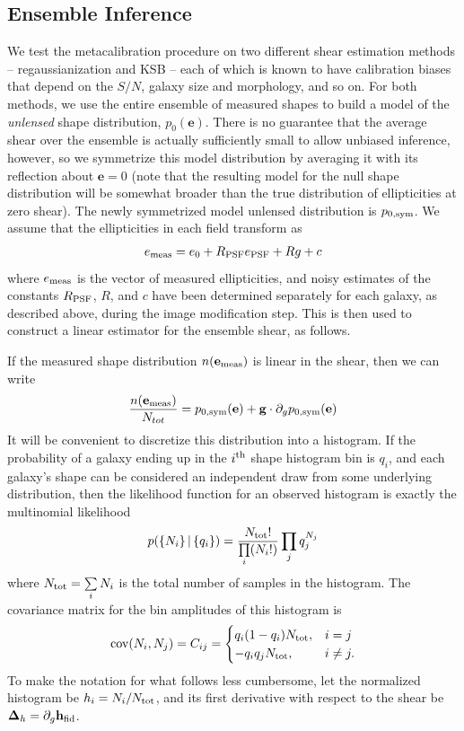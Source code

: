 \documentclass[iop]{emulateapj}
\begin{document}
\subsection{Ensemble Inference}
We test the metacalibration procedure on two different shear
estimation methods -- regaussianization and KSB -- each of which is
known to have calibration biases that depend on the $S/N$, galaxy size
and morphology, and so on. For both methods, we use the entire
ensemble of measured shapes to build a model of the {\it unlensed}
shape distribution, $p_0(\mathbf{e})$. There is no guarantee that the
average shear over the ensemble is actually sufficiently small to
allow unbiased inference, however, so we symmetrize this model
distribution by averaging it with its reflection about $\mathbf{e}=0$
(note that the resulting model for the null shape distribution will be
somewhat broader than the true distribution of ellipticities at zero
shear). The newly symmetrized model unlensed distribution is
$p_{0,\rm sym}$. We assume that the ellipticities in each field
transform as
\begin{align}
{e}_{\rm meas} = {e}_{0} + R_{\rm PSF}{e}_{\rm PSF} + R{g} + {c}
\label{eqn:edist_model}
\end{align}
where $e_{\rm meas}$ is the vector of measured ellipticities, and
noisy estimates of the constants $R_{\rm PSF}$, $R$, and $c$ have been
determined separately for each galaxy, as described above, during the
image modification step. This is then used to construct a linear
estimator for the ensemble shear, as follows.

If the measured shape distribution $n(\mathbf{e}_{\rm meas})$ is linear
in the shear, then we can write
\begin{align}
\frac{n(\mathbf{e}_{\rm meas})}{N_{tot}} = p_{0,\rm sym}(\mathbf{e}) + \mathbf{g}\cdot \partial_{g} p_{0,\rm sym}(\mathbf{e})
\end{align}
It will be convenient to discretize this distribution into a
histogram. If the probability of a galaxy ending up in the
$i^{\rm th}$ shape histogram bin is $q_i$, and each galaxy's shape can
be considered an independent draw from some underlying distribution,
then the likelihood function for an observed histogram is exactly the
multinomial likelihood
\begin{align}
p( \left\{N_i\right\} |\left\{ q_i\right\} ) = \frac{N_{\rm tot}!}{\prod\limits_i (N_i!)}\prod\limits_j q_j^{N_j}
\label{eqn:multnomial}
\end{align}
where $N_{\rm tot} = \sum\limits_i N_i$ is the total number of samples
in the histogram. The covariance matrix for the
bin amplitudes of this histogram is
\begin{align}
{\rm cov}(N_i, N_j) = C_{ij} = \begin{cases}
  q_i(1-q_i)N_{\rm tot}, & i=j \\
  -q_iq_j N_{\rm tot}, & i \neq j.
\end{cases}
\end{align}
To make the notation for what follows less cumbersome, let the
normalized histogram be $h_i = N_i / N_{\rm tot}$, and its first
derivative with respect to the shear be
$\mathbf{\Delta}_h=\partial_{g}\mathbf{h}_{\rm fid}$.
\end{document}
